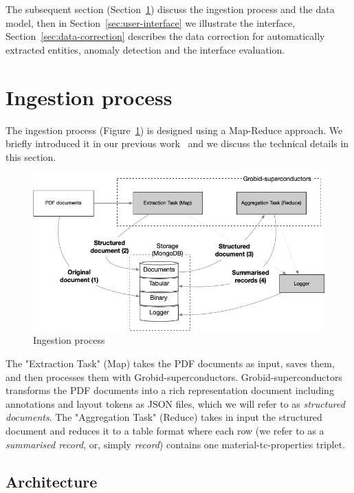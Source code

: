 \documentclass[a4paper]{article}
\begin{document}
The subsequent section (Section~\ref{sec:ingestion}) discuss the ingestion process and the data model, then in Section~\ref{sec:user-interface} we illustrate the interface, Section~\ref{sec:data-correction} describes the data correction for automatically extracted entities, anomaly detection and the interface evaluation. 


\section{Ingestion process}
\label{sec:ingestion}

The ingestion process (Figure~\ref{fig:map-reduce}) is designed using a Map-Reduce approach. 
We briefly introduced it in our previous work~\cite{lfoppiano2023automatic} and we discuss the technical details in this section. 

\begin{figure}[ht]
  \centering
  \includegraphics[width=\textwidth]{images/ingestion-schema.png} 
  \caption{Ingestion process}
  \label{fig:map-reduce}
\end{figure}


The "Extraction Task" (Map) takes the PDF documents as input, saves them, and then processes them with Grobid-superconductors. 
Grobid-superconductors transforms the PDF documents into a rich representation document including annotations and layout tokens as JSON files, which we will refer to as \textit{structured documents}.  
The "Aggregation Task" (Reduce) takes in input the structured document and reduces it to a table format where each row (we refer to as a \textit{summarised record}, or, simply \textit{record}) contains one material-tc-properties triplet.

\subsection{Architecture}
\label{sec:architecture}
\end{document}
